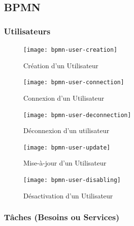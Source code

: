 \documentclass[french,12pt]{article}
\begin{document}
		\newpage
		\subsection{BPMN}

			\subsubsection{Utilisateurs}

				\vspace*{\fill}
				\begin{figure}[h]
					\centering
					\texttt{[image: bpmn-user-creation]}
					\caption{Création d’un Utilisateur}
				\end{figure}
				\vspace*{\fill}

				\newpage
				\vspace*{\fill}
				\begin{figure}[h]
					\centering
					\texttt{[image: bpmn-user-connection]}
					\caption{Connexion d’un Utilisateur}
				\end{figure}
				\vspace*{\fill}

				\newpage
				\vspace*{\fill}
				\begin{figure}[h]
					\centering
					\texttt{[image: bpmn-user-deconnection]}
					\caption{Déconnexion d’un utilisateur}
				\end{figure}
				\vspace*{\fill}

				\newpage
				\vspace*{\fill}
				\begin{figure}[h]
					\centering
					\texttt{[image: bpmn-user-update]}
					\caption{Mise-à-jour d’un Utilisateur}
				\end{figure}
				\vspace*{\fill}

				\newpage
				\vspace*{\fill}
				\begin{figure}[h]
					\centering
					\texttt{[image: bpmn-user-disabling]}
					\caption{Désactivation d’un Utilisateur}
				\end{figure}
				\vspace*{\fill}

			\newpage
			\subsubsection{Tâches (Besoins ou Services)}
\end{document}
